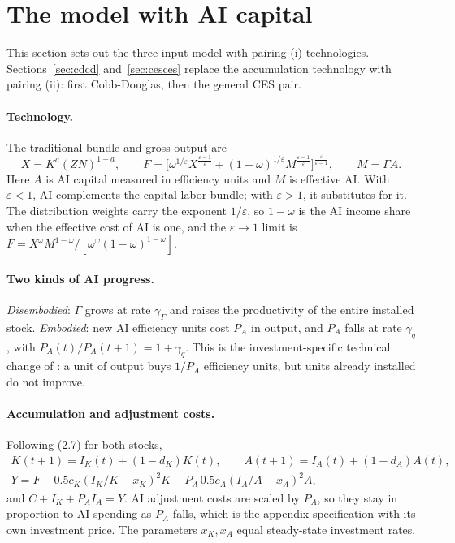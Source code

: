 \documentclass[11pt]{article}
\newcommand{\e}{\varepsilon}
\begin{document}
\section{The model with AI capital}

This section sets out the three-input model with pairing (i) technologies.
Sections~\ref{sec:cdcd} and~\ref{sec:cesces} replace the accumulation technology
with pairing (ii): first Cobb-Douglas, then the general CES pair.

\paragraph{Technology.} The traditional bundle and gross output are
\begin{equation}
X = K^a (ZN)^{1-a},\qquad
F = \Big[\omega^{1/\e} X^{\frac{\e-1}{\e}} + (1-\omega)^{1/\e} M^{\frac{\e-1}{\e}}\Big]^{\frac{\e}{\e-1}},
\qquad M=\Gamma A .
\end{equation}
Here $A$ is AI capital measured in efficiency units and $M$ is effective AI. With $\e<1$,
AI complements the capital-labor bundle; with $\e>1$, it substitutes for it. The
distribution weights carry the exponent $1/\e$, so $1-\omega$ is the AI income share
when the effective cost of AI is one, and the $\e\to1$ limit is
$F=X^\omega M^{1-\omega}/[\omega^\omega(1-\omega)^{1-\omega}]$.

\paragraph{Two kinds of AI progress.}
\emph{Disembodied}: $\Gamma$ grows at rate $\gamma_\Gamma$ and raises the productivity
of the entire installed stock. \emph{Embodied}: new AI efficiency units cost $P_A$ in
output, and $P_A$ falls at rate $\gamma_q$, with $P_A(t)/P_A(t+1)=1+\gamma_q$. This is the
investment-specific technical change of \citet{ghk1997}: a unit of output buys
$1/P_A$ efficiency units, but units already installed do not improve.

\paragraph{Accumulation and adjustment costs.} Following (2.7) for both stocks,
\begin{gather}
K(t+1)=I_K(t)+(1-d_K)K(t),\qquad A(t+1)=I_A(t)+(1-d_A)A(t),\\
Y = F - 0.5c_K(I_K/K-x_K)^2K - P_A\,0.5c_A(I_A/A-x_A)^2A,
\end{gather}
and $C + I_K + P_A I_A = Y$. AI adjustment costs are scaled by $P_A$, so they stay in
proportion to AI spending as $P_A$ falls, which is the appendix specification with its
own investment price. The parameters $x_K,x_A$ equal steady-state investment rates.
\end{document}
